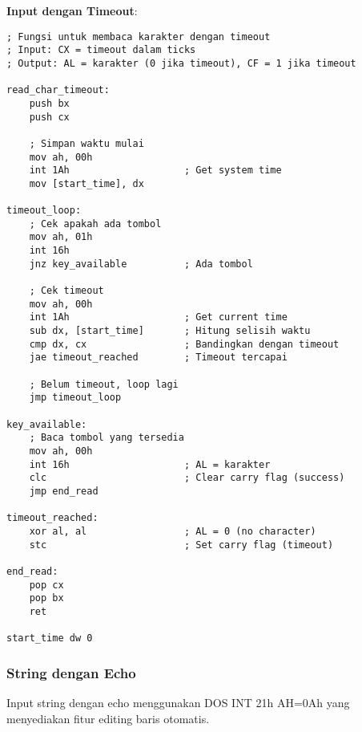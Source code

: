 \documentclass[../main.tex]{subfiles}
\begin{document}
\textbf{Input dengan Timeout}:
\begin{lstlisting}[language={[x86masm]Assembler}, caption=Input Karakter dengan Timeout, label={lst:char-timeout}]
; Fungsi untuk membaca karakter dengan timeout
; Input: CX = timeout dalam ticks
; Output: AL = karakter (0 jika timeout), CF = 1 jika timeout

read_char_timeout:
    push bx
    push cx
    
    ; Simpan waktu mulai
    mov ah, 00h
    int 1Ah                    ; Get system time
    mov [start_time], dx
    
timeout_loop:
    ; Cek apakah ada tombol
    mov ah, 01h
    int 16h
    jnz key_available          ; Ada tombol
    
    ; Cek timeout
    mov ah, 00h
    int 1Ah                    ; Get current time
    sub dx, [start_time]       ; Hitung selisih waktu
    cmp dx, cx                 ; Bandingkan dengan timeout
    jae timeout_reached        ; Timeout tercapai
    
    ; Belum timeout, loop lagi
    jmp timeout_loop
    
key_available:
    ; Baca tombol yang tersedia
    mov ah, 00h
    int 16h                    ; AL = karakter
    clc                        ; Clear carry flag (success)
    jmp end_read
    
timeout_reached:
    xor al, al                 ; AL = 0 (no character)
    stc                        ; Set carry flag (timeout)
    
end_read:
    pop cx
    pop bx
    ret
    
start_time dw 0
\end{lstlisting}

            \subsubsection{String dengan Echo}
Input string dengan echo menggunakan DOS INT 21h AH=0Ah yang menyediakan fitur editing baris otomatis.
\end{document}
